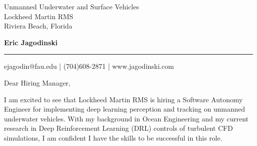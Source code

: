 \documentclass[11pt]{letter} %
\begin{document}

\begin{letter}{Unmanned Underwater and Surface Vehicles \\
Lockheed Martin RMS \\
Riviera Beach, Florida
}


\begin{center}
\huge\bf Eric Jagodinski \\ %
\vspace{15pt} \hrule height 1pt %
\end{center} 

\begin{center}
\large%
ejagodin@fau.edu | (704)608-2871 | www.jagodinski.com %
\end{center} 




\opening{Dear Hiring Manager,} 
 
 
I am excited to see that Lockheed Martin RMS is hiring a Software Autonomy Engineer for  implementing deep learning perception and tracking on unmanned underwater vehicles. With my background in Ocean Engineering and my current research in Deep Reinforcement Learning (DRL) controls of turbulent CFD simulations, I am confident I have the skills to be successful in this role.
 

\end{letter}
\end{document}
